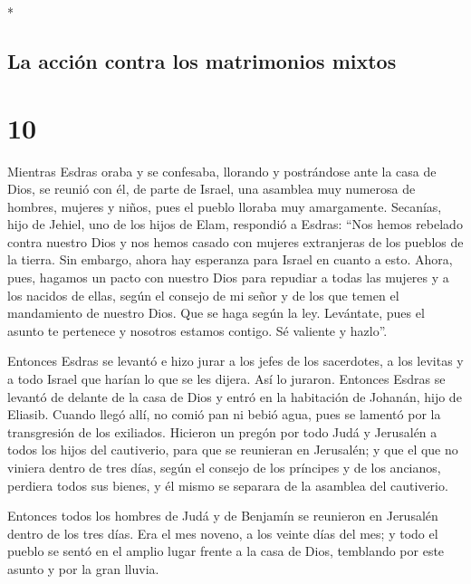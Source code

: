 \begin{paracol}{2}
\begin{otherlanguage}{english}
\end{otherlanguage}

\switchcolumn[0]*

\hypertarget{la-acciuxf3n-contra-los-matrimonios-mixtos}{%
\subsection{La acción contra los matrimonios
mixtos}\label{la-acciuxf3n-contra-los-matrimonios-mixtos}}

\hypertarget{section-18}{%
\section{10}\label{section-18}}

 Mientras Esdras oraba y se confesaba, llorando y
postrándose ante la casa de Dios, se reunió con él, de parte de Israel,
una asamblea muy numerosa de hombres, mujeres y niños, pues el pueblo
lloraba muy amargamente.  Secanías, hijo de Jehiel, uno de
los hijos de Elam, respondió a Esdras: ``Nos hemos rebelado contra
nuestro Dios y nos hemos casado con mujeres extranjeras de los pueblos
de la tierra. Sin embargo, ahora hay esperanza para Israel en cuanto a
esto.  Ahora, pues, hagamos un pacto con nuestro Dios para
repudiar a todas las mujeres y a los nacidos de ellas, según el consejo
de mi señor y de los que temen el mandamiento de nuestro Dios. Que se
haga según la ley.  Levántate, pues el asunto te pertenece
y nosotros estamos contigo. Sé valiente y hazlo''.

 Entonces Esdras se levantó e hizo jurar a los jefes de
los sacerdotes, a los levitas y a todo Israel que harían lo que se les
dijera. Así lo juraron.  Entonces Esdras se levantó de
delante de la casa de Dios y entró en la habitación de Johanán, hijo de
Eliasib. Cuando llegó allí, no comió pan ni bebió agua, pues se lamentó
por la transgresión de los exiliados.  Hicieron un pregón
por todo Judá y Jerusalén a todos los hijos del cautiverio, para que se
reunieran en Jerusalén;  y que el que no viniera dentro de
tres días, según el consejo de los príncipes y de los ancianos, perdiera
todos sus bienes, y él mismo se separara de la asamblea del cautiverio.

 Entonces todos los hombres de Judá y de Benjamín se
reunieron en Jerusalén dentro de los tres días. Era el mes noveno, a los
veinte días del mes; y todo el pueblo se sentó en el amplio lugar frente
a la casa de Dios, temblando por este asunto y por la gran lluvia.


\end{paracol}
